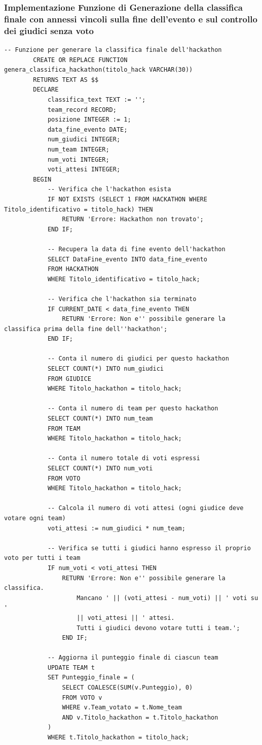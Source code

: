\documentclass[a4paper, 10pt]{article}
\begin{document}
	\subsubsection{Implementazione Funzione di Generazione della classifica finale con annessi vincoli sulla fine dell'evento e sul controllo dei giudici senza voto}
	\begin{lstlisting}[style=sqlstyle]
		-- Funzione per generare la classifica finale dell'hackathon
		CREATE OR REPLACE FUNCTION genera_classifica_hackathon(titolo_hack VARCHAR(30))
		RETURNS TEXT AS $$
		DECLARE
			classifica_text TEXT := '';
			team_record RECORD;
			posizione INTEGER := 1;
			data_fine_evento DATE;
			num_giudici INTEGER;
			num_team INTEGER;
			num_voti INTEGER;
			voti_attesi INTEGER;
		BEGIN
			-- Verifica che l'hackathon esista
			IF NOT EXISTS (SELECT 1 FROM HACKATHON WHERE Titolo_identificativo = titolo_hack) THEN
				RETURN 'Errore: Hackathon non trovato';
			END IF;
			
			-- Recupera la data di fine evento dell'hackathon
			SELECT DataFine_evento INTO data_fine_evento
			FROM HACKATHON
			WHERE Titolo_identificativo = titolo_hack;
			
			-- Verifica che l'hackathon sia terminato
			IF CURRENT_DATE < data_fine_evento THEN
				RETURN 'Errore: Non e'' possibile generare la classifica prima della fine dell''hackathon';
			END IF;
			
			-- Conta il numero di giudici per questo hackathon
			SELECT COUNT(*) INTO num_giudici
			FROM GIUDICE
			WHERE Titolo_hackathon = titolo_hack;
			
			-- Conta il numero di team per questo hackathon
			SELECT COUNT(*) INTO num_team
			FROM TEAM
			WHERE Titolo_hackathon = titolo_hack;
			
			-- Conta il numero totale di voti espressi
			SELECT COUNT(*) INTO num_voti
			FROM VOTO
			WHERE Titolo_hackathon = titolo_hack;
			
			-- Calcola il numero di voti attesi (ogni giudice deve votare ogni team)
			voti_attesi := num_giudici * num_team;
			
			-- Verifica se tutti i giudici hanno espresso il proprio voto per tutti i team
			IF num_voti < voti_attesi THEN
				RETURN 'Errore: Non e'' possibile generare la classifica. 
					Mancano ' || (voti_attesi - num_voti) || ' voti su ' 
					|| voti_attesi || ' attesi. 
					Tutti i giudici devono votare tutti i team.';
				END IF;
			
			-- Aggiorna il punteggio finale di ciascun team
			UPDATE TEAM t
			SET Punteggio_finale = (
				SELECT COALESCE(SUM(v.Punteggio), 0)
				FROM VOTO v
				WHERE v.Team_votato = t.Nome_team
				AND v.Titolo_hackathon = t.Titolo_hackathon
			)
			WHERE t.Titolo_hackathon = titolo_hack;
			

\end{lstlisting}
\end{document}
